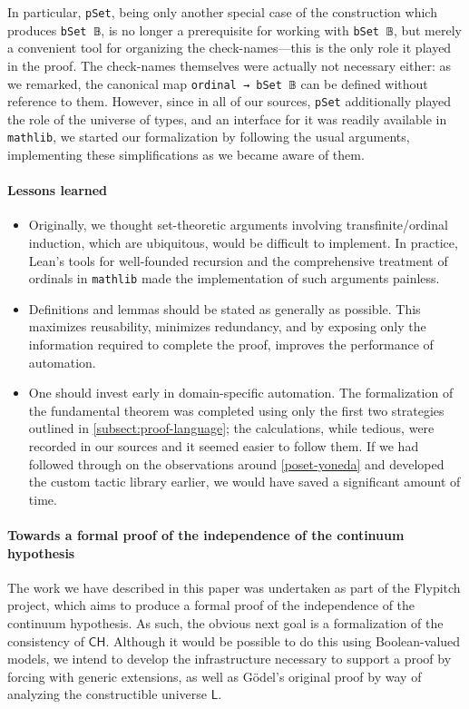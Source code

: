 \documentclass[a4paper,USenglish,cleveref, autoref]{lipics-v2019}
\newcommand{\lil}{\lstinline}
\theoremstyle{theorem}
\theoremstyle{definition}
\begin{document}
In particular, \lstinline{pSet}, being only another special case of the construction which produces \lstinline{bSet 𝔹}, is no longer a prerequisite for working with \lstinline{bSet 𝔹}, but merely a convenient tool for organizing the check-names---this is the only role it played in the proof. The check-names themselves were actually not necessary either: as we remarked, the canonical map \lil{ordinal → bSet 𝔹} can be defined without reference to them. However, since in all of our sources, \lstinline{pSet} additionally played the role of the universe of types, and an interface for it was readily available in \lstinline{mathlib}, we started our formalization by following the usual arguments, implementing these simplifications as we became aware of them.
\paragraph*{Lessons learned}
\begin{itemize}
\item Originally, we thought set-theoretic arguments involving transfinite/ordinal induction, which are ubiquitous, would be difficult to implement. In practice, Lean's tools for well-founded recursion and the comprehensive treatment of ordinals in \lstinline{mathlib} made the implementation of such arguments painless.
\item Definitions and lemmas should be stated as generally as possible. This maximizes reusability, minimizes redundancy, and by exposing only the information required to complete the proof, improves the performance of automation.
\item One should invest early in domain-specific automation. The formalization of the fundamental theorem was completed using only the first two strategies outlined in \autoref{subsect:proof-language}; the calculations, while tedious, were recorded in our sources and it seemed easier to follow them. If we had followed through on the observations around \autoref{poset-yoneda} and developed the custom tactic library earlier, we would have saved a significant amount of time.
\end{itemize}
\paragraph*{Towards a formal proof of the independence of the continuum hypothesis}

The work we have described in this paper was undertaken as part of the Flypitch project, which aims to produce a formal proof of the independence of the continuum hypothesis. As such, the obvious next goal is a formalization of the consistency of $\mathsf{CH}$. Although it would be possible to do this using Boolean-valued models, we intend to develop the infrastructure necessary to support a proof by forcing with generic extensions, as well as G\"odel's original proof by way of analyzing the constructible universe $\mathsf{L}$.
\end{document}
